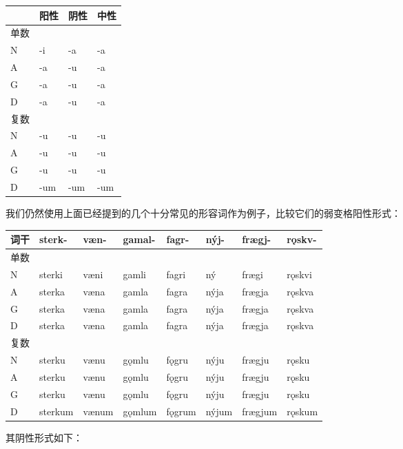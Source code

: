 \begin{longtable}{llll}
  \toprule
     & 阳性  & 阴性  & 中性  \\
  \midrule
  \endhead
  \bottomrule
  \endfoot
  单数 &     &     &     \\
  N  & -i  & -a  & -a  \\
  A  & -a  & -u  & -a  \\
  G  & -a  & -u  & -a  \\
  D  & -a  & -u  & -a  \\
  复数 &     &     &     \\
  N  & -u  & -u  & -u  \\
  A  & -u  & -u  & -u  \\
  G  & -u  & -u  & -u  \\
  D  & -um & -um & -um \\
\end{longtable}

我们仍然使用上面已经提到的几个十分常见的形容词作为例子，比较它们的弱变格阳性形式：

\begin{longtable}{llllllll}
  \toprule
  词干 & sterk-  & væn-  & gamal- & fagr-  & nýj-  & frægj-  & rǫskv- \\
  \midrule
  \endhead
  \bottomrule
  \endfoot
  单数 &         &       &        &        &       &         &        \\
  N  & sterki  & væni  & gamli  & fagri  & ný    & frægi   & rǫskvi \\
  A  & sterka  & væna  & gamla  & fagra  & nýja  & frægja  & rǫskva \\
  G  & sterka  & væna  & gamla  & fagra  & nýja  & frægja  & rǫskva \\
  D  & sterka  & væna  & gamla  & fagra  & nýja  & frægja  & rǫskva \\
  复数 &         &       &        &        &       &         &        \\
  N  & sterku  & vænu  & gǫmlu  & fǫgru  & nýju  & frægju  & rǫsku  \\
  A  & sterku  & vænu  & gǫmlu  & fǫgru  & nýju  & frægju  & rǫsku  \\
  G  & sterku  & vænu  & gǫmlu  & fǫgru  & nýju  & frægju  & rǫsku  \\
  D  & sterkum & vænum & gǫmlum & fǫgrum & nýjum & frægjum & rǫskum \\
\end{longtable}

其阴性形式如下：

